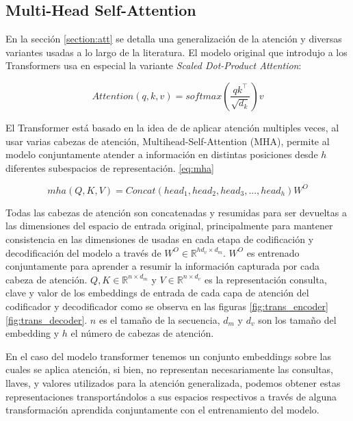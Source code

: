 \subsection{Multi-Head Self-Attention}

En la sección \ref{section:att} se detalla una generalización de la atención y diversas variantes usadas
a lo largo de la literatura. El modelo original que introdujo a los Transformers usa en especial la variante
\textit{Scaled Dot-Product Attention}\cite{Vaswani}:

\begin{equation}
    Attention(q, k, v) = softmax(\frac{q k^\top}{\sqrt{d_k}}) v
    \label{eq:trans_att_gen}
\end{equation}

El Transformer está basado en la idea de de aplicar atención multiples veces, al usar varias cabezas
de atención, Multihead-Self-Attention (MHA), permite  al modelo conjuntamente atender a información
en distintas posiciones desde $h$ diferentes subespacios de representación. \ref{eq:mha}

\begin{equation}
    mha(Q, K, V) = Concat(head_1,head_2,head_3,..., head_h)W^O
    \label{eq:mha}
\end{equation}

Todas las cabezas de atención son concatenadas y resumidas para ser devueltas a las dimensiones del
espacio de entrada original, principalmente para mantener consistencia en las dimensiones de usadas
en cada etapa de codificación y decodificación del modelo a través de $W^O \in \mathbb{R}^{hd_v \times d_m}$.
$W^O$ es entrenado conjuntamente para aprender a resumir la información capturada por cada cabeza de
atención. $Q, K \in \mathbb{R}^{n \times d_{m}}$ y $V \in \mathbb{R}^{n \times d_{v}}$ es la representación
consulta, clave y valor de los embeddings de entrada de cada capa de atención del codificador y
decodificador como se observa en las figuras \ref{fig:trans_encoder} \ref{fig:trans_decoder}.
$n$ es el tamaño de la secuencia, $d_m$ y $d_v$ son los tamaño del embedding y $h$ el número de
cabezas de atención.

En el caso del modelo transformer tenemos un conjunto embeddings sobre las cuales se aplica atención,
si bien, no representan necesariamente las consultas, llaves, y valores utilizados para la atención
generalizada, podemos obtener estas representaciones transportándolos a sus espacios respectivos a través de alguna
transformación aprendida conjuntamente con el entrenamiento del modelo.

